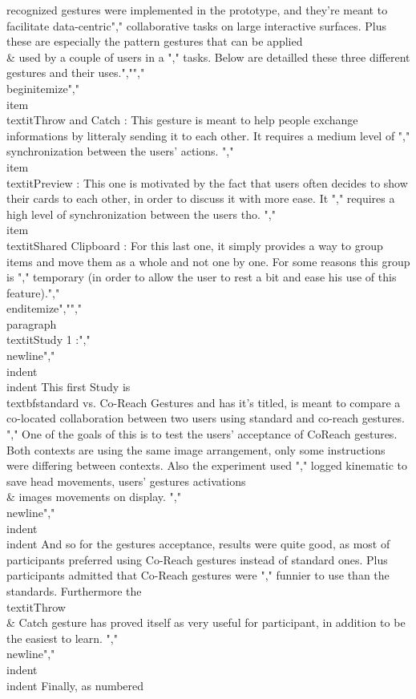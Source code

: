 recognized gestures were implemented in the prototype, and they're meant to facilitate data-centric","    collaborative tasks on large interactive surfaces. Plus these are especially the pattern gestures that can be applied \\& used by a couple of users in a ","    tasks. Below are detailled these three different gestures and their uses.","","    \\begin{itemize}","        \\item \\textit{Throw and Catch :} This gesture is meant to help people exchange informations by litteraly sending it to each other. It requires a medium level of ","                                        synchronization between the users' actions. ","        \\item \\textit{Preview :} This one is motivated by the fact that users often decides to show their cards to each other, in order to discuss it with more ease. It ","                                requires a high level of synchronization between the users tho. ","        \\item \\textit{Shared Clipboard :} For this last one, it simply provides a way to group items and move them as a whole and not one by one. For some reasons this group is ","                                        temporary (in order to allow the user to rest a bit and ease his use of this feature).","    \\end{itemize}","","    \\paragraph{ \\textit{Study 1 :}","                \\newline}","    \\indent \\indent This first Study is \\textbf{standard vs. Co-Reach Gestures} and has it's titled, is meant to compare a co-located collaboration between two users using standard and co-reach gestures. ","    One of the goals of this is to test the users' acceptance of CoReach gestures. Both contexts are using the same image arrangement, only some instructions were differing between contexts. Also the experiment used ","    logged kinematic to save head movements, users' gestures activations \\& images movements on display. ","    \\newline","    \\indent \\indent And so for the gestures acceptance, results were quite good, as most of participants preferred using Co-Reach gestures instead of standard ones. Plus participants admitted that Co-Reach gestures were ","    funnier to use than the standards. Furthermore the \\textit{Throw \\& Catch} gesture has proved itself as very useful for participant, in addition to be the easiest to learn. ","    \\newline","    \\indent \\indent Finally, as numbered 